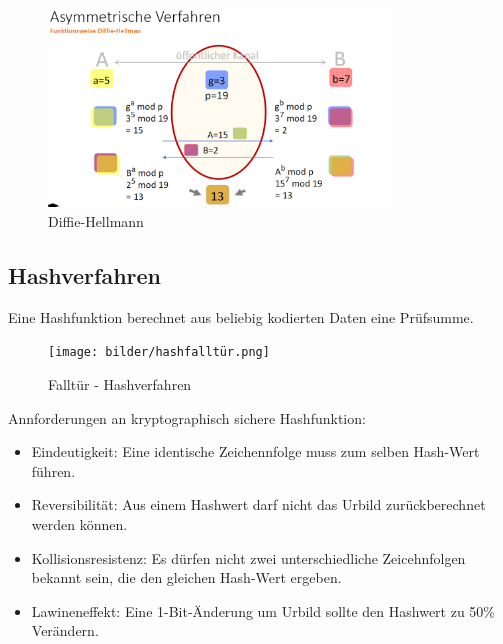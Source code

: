 \documentclass[a4paper,12pt]{article}
\begin{document}
\begin{figure}[H]
    \centering
    \includegraphics[width=0.8\textwidth]{bilder/diffie.png}
    \caption{Diffie-Hellmann}
    \label{fig:diffie}
\end{figure}

\begin{table}[h!]
    \centering
    \caption{Vergleich kryptographischer Verfahren}
    \end{table}
    
    
\subsection{Hashverfahren}
Eine Hashfunktion berechnet aus beliebig kodierten Daten eine Prüfsumme.
\begin{figure}[H]
    \centering
    \texttt{[image: bilder/hashfalltür.png]}
    \caption{Falltür - Hashverfahren}
    \label{fig:hash}
\end{figure}

Annforderungen an kryptographisch sichere Hashfunktion:
\begin{itemize}
    \item Eindeutigkeit: Eine identische Zeichennfolge muss zum selben Hash-Wert führen. 
    \item Reversibilität: Aus einem Hashwert darf nicht das Urbild zurückberechnet werden können.
    \item Kollisionsresistenz: Es dürfen nicht zwei unterschiedliche Zeicehnfolgen bekannt sein, die den gleichen Hash-Wert ergeben. 
    \item Lawineneffekt: Eine 1-Bit-Änderung um Urbild sollte den Hashwert zu 50\% Verändern. 
\end{itemize}
\end{document}

